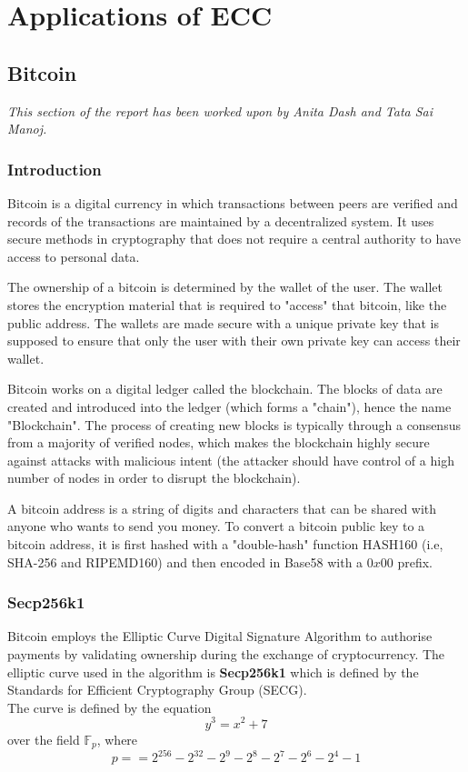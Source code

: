 \chapter{Applications of ECC} 

\section{Bitcoin}
\textit{This section of the report has been worked upon by Anita Dash and Tata Sai Manoj.}


\subsection{Introduction}
Bitcoin is a digital currency in which transactions between peers are verified and records of the transactions are maintained by a decentralized system. It uses secure methods in cryptography that does not require a central authority to have access to personal data.  

The ownership of a bitcoin is determined by the wallet of the user. The wallet stores the encryption material that is required to "access" that bitcoin, like the public address. The wallets are made secure with a unique private key that is supposed to ensure that only the user with their own private key can access their wallet. 

Bitcoin works on a digital ledger called the blockchain. The blocks of data are created and introduced into the ledger (which forms a "chain"), hence the name "Blockchain". The process of creating new blocks is typically through a consensus from a majority of verified nodes, which makes the blockchain highly secure against attacks with malicious intent (the attacker should have control of a high number of nodes in order to disrupt the blockchain). 

A bitcoin address is a string of digits and characters that can be shared with anyone who wants to send you money. To convert a bitcoin public key to a bitcoin address, it is first hashed with a "double-hash" function HASH160 (i.e, SHA-256 and RIPEMD160) and then encoded in Base58 with a $0x00$ prefix. 

\subsection{Secp256k1}
Bitcoin employs the Elliptic Curve Digital Signature Algorithm to authorise payments by validating ownership during the exchange of cryptocurrency. The elliptic curve used in the algorithm is \textbf{Secp256k1} which is defined by the Standards for Efficient Cryptography Group (SECG).\\
The curve is defined by the equation
\[y^3 = x^2 + 7\]
over the field $\mathbb{F}_p$, where 
\[p = = 2^{256} − 2^{32} − 2^9 − 2^8 − 2^7 − 2^6 − 2^4 − 1\]



